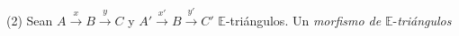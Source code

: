 \documentclass[preview]{standalone}
\begin{document}
\begin{center}
(2) Sean $A\xrightarrow{x}B\xrightarrow{y}C$ y $A'\xrightarrow{x'}B\xrightarrow{y'}C'$ $\mathbb{E}$-triángulos. Un \emph{morfismo de} $\mathbb{E}$-\emph{triángulos}
\end{center}
\end{document}
